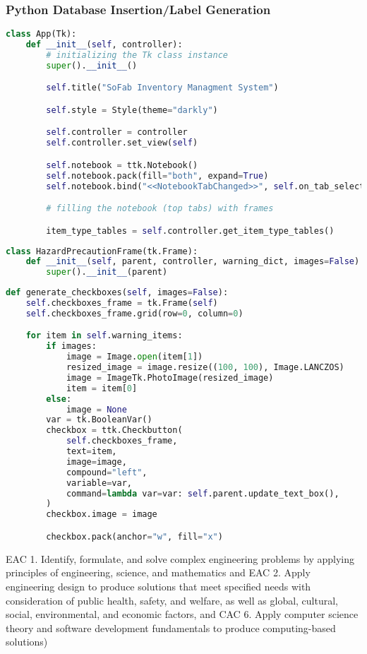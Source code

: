 \documentclass{article}
\begin{document}
\subsubsection{Python Database Insertion\slash Label Generation}
\begin{lstlisting}[language=Python]
class App(Tk):
    def __init__(self, controller):
        # initializing the Tk class instance
        super().__init__()

        self.title("SoFab Inventory Managment System")

        self.style = Style(theme="darkly")

        self.controller = controller
        self.controller.set_view(self)

        self.notebook = ttk.Notebook()
        self.notebook.pack(fill="both", expand=True)
        self.notebook.bind("<<NotebookTabChanged>>", self.on_tab_selection)

        # filling the notebook (top tabs) with frames

        item_type_tables = self.controller.get_item_type_tables()
\end{lstlisting}
\begin{lstlisting}[language=Python]
class HazardPrecautionFrame(tk.Frame):
    def __init__(self, parent, controller, warning_dict, images=False):
        super().__init__(parent)
\end{lstlisting}
\begin{lstlisting}[language=Python]
def generate_checkboxes(self, images=False):
    self.checkboxes_frame = tk.Frame(self)
    self.checkboxes_frame.grid(row=0, column=0)

    for item in self.warning_items:
        if images:
            image = Image.open(item[1])
            resized_image = image.resize((100, 100), Image.LANCZOS)
            image = ImageTk.PhotoImage(resized_image)
            item = item[0]
        else:
            image = None
        var = tk.BooleanVar()
        checkbox = ttk.Checkbutton(
            self.checkboxes_frame,
            text=item,
            image=image,
            compound="left",
            variable=var,
            command=lambda var=var: self.parent.update_text_box(),
        )
        checkbox.image = image

        checkbox.pack(anchor="w", fill="x")
\end{lstlisting}

EAC 1. Identify, formulate, and solve complex engineering problems by 
applying principles of engineering, science, and mathematics and EAC 2. 
Apply engineering design to produce solutions that meet specified needs with 
consideration of public health, safety, and welfare, as well as global, cultural, 
social, environmental, and economic factors, and CAC 6. Apply computer 
science theory and software development fundamentals to produce 
computing-based solutions) 
\end{document}
